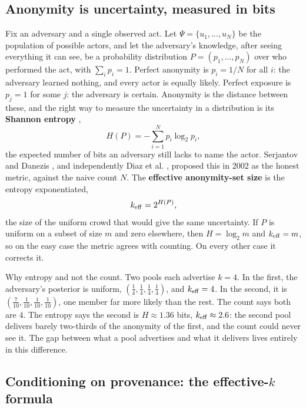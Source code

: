 \documentclass[11pt]{article}
\begin{document}
\subsection{Anonymity is uncertainty, measured in bits}

Fix an adversary and a single observed act. Let $\Psi = \{u_1, \dots, u_N\}$ be the
population of possible actors, and let the adversary's knowledge, after seeing everything
it can see, be a probability distribution $P = (p_1, \dots, p_N)$ over who performed the
act, with $\sum_i p_i = 1$. Perfect anonymity is $p_i = 1/N$ for all $i$: the adversary
learned nothing, and every actor is equally likely. Perfect exposure is $p_j = 1$ for
some $j$: the adversary is certain. Anonymity is the distance between these, and the
right way to measure the uncertainty in a distribution is its \textbf{Shannon entropy}
\cite{shannon},
\[ H(P) = -\sum_{i=1}^{N} p_i \log_2 p_i, \]
the expected number of bits an adversary still lacks to name the actor. Serjantov and
Danezis \cite{serjantov2002}, and independently Diaz et al. \cite{diaz2002}, proposed
this in 2002 as the honest metric, against the naive count $N$. The
\textbf{effective anonymity-set size} is the entropy exponentiated,
\[ k_{\mathrm{eff}} = 2^{H(P)}, \]
the size of the uniform crowd that would give the same uncertainty. If $P$ is uniform on
a subset of size $m$ and zero elsewhere, then $H = \log_2 m$ and $k_{\mathrm{eff}} = m$, so on the
easy case the metric agrees with counting. On every other case it corrects it.

\begin{intuition}
Why entropy and not the count. Two pools each advertise $k = 4$. In the first, the
adversary's posterior is uniform, $(\tfrac14,\tfrac14,\tfrac14,\tfrac14)$, and
$k_{\mathrm{eff}} = 4$. In the second, it is $(\tfrac{7}{10}, \tfrac1{10}, \tfrac1{10}, \tfrac1{10})$,
one member far more likely than the rest. The count says both are $4$. The entropy says
the second is $H \approx 1.36$ bits, $k_{\mathrm{eff}} \approx 2.6$: the second pool delivers barely
two-thirds of the anonymity of the first, and the count could never see it. The gap
between what a pool advertises and what it delivers lives entirely in this difference.
\end{intuition}

\subsection{Conditioning on provenance: the effective-\texorpdfstring{$k$}{k} formula}
\end{document}
